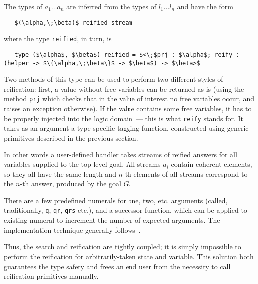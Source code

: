 The types of \mbox{$a_1\dots a_n$} are inferred from the types of \mbox{$l_1\dots l_n$} and
have the form

\begin{lstlisting}
   $(\alpha,\;\beta)$ reified stream
\end{lstlisting}

\noindent where the type \lstinline{reified}, in turn, is

\begin{lstlisting}
   type ($\alpha$, $\beta$) reified = $<\;$prj : $\alpha$; reify : (helper -> $\{\alpha,\;\beta\}$ -> $\beta$) -> $\beta>$
\end{lstlisting}

Two methods of this type can be used to perform two different styles of reification: first, a value without
free variables can be returned as is (using the method \lstinline{prj} which checks that in the value of
interest no free variables occur, and raises an exception otherwise). If the value contains some free
variables, it has to be properly injected into the logic domain~--- this is what \lstinline{reify} stands
for. It takes as an argument a type-specific tagging function, constructed using generic
primitives described in the previous section.

In other words a user-defined handler takes streams of reified answers for all variables supplied to the top-level
goal. All streams $a_i$ contain coherent elements, so they all have the same length and $n$-th elements of all
streams correspond to the $n$-th answer, produced by the goal $G$.

There are a few predefined numerals for one, two, etc. arguments (called, traditionally,
\lstinline{q}, \lstinline{qr}, \lstinline{qrs} etc.), and a successor function, which
can be applied to existing numeral to increment the number of expected arguments. The
implementation technique generally follows~\cite{Unparsing, DoWeNeed}.

Thus, the search and reification are tightly coupled; it is simply impossible to perform the reification
for arbitrarily-taken state and variable. This solution both guarantees the type safety and frees an end
user from the necessity to call reification primitives manually.

